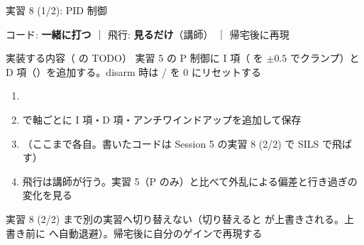 \begin{frame}[fragile]{実習 8 (1/2): PID 制御}
  \vspace{0.15em}

  {\footnotesize コード: \textcolor{sfblue}{\textbf{一緒に打つ}} ｜ 飛行: \textcolor{sfblue}{\textbf{見るだけ}}（講師） ｜ 帰宅後に再現}

  \vspace{0.3em}

  \begin{block}{実装する内容（ の TODO）}\footnotesize
    実習 5 の P 制御に I 項（ を $\pm0.5$ でクランプ）と
    D 項（）を追加する。disarm 時は
    / を 0 にリセットする
  \end{block}

  \begin{enumerate}\footnotesize\setlength{\itemsep}{0pt}
    \item {}
    \item {} で軸ごとに I 項・D 項・アンチワインドアップを追加して保存
    \item {}（ここまで各自。書いたコードは Session 5 の実習 8 (2/2) で SILS で飛ばす）
    \item 飛行は講師が行う。実習 5（P のみ）と比べて外乱による偏差と行き過ぎの変化を見る
  \end{enumerate}

  {\footnotesize 実習 8 (2/2) まで別の実習へ切り替えない（切り替えると  が上書きされる。上書き前に  へ自動退避）。帰宅後に自分のゲインで再現する}
\end{frame}

